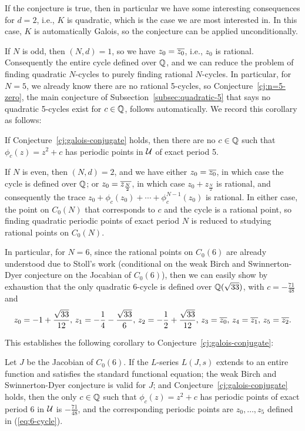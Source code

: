 If the conjecture is true, then in particular we have some interesting
consequences for $d = 2$, i.e., $K$ is quadratic, which is the case we
are most interested in. In this case, $K$ is automatically Galois, so
the conjecture can be applied unconditionally.

If $N$ is odd, then $(N, d) = 1$, so we have $z_0 = \overline{z_0}$, i.e.,
$z_0$ is rational. Consequently the entire cycle defined over $\mathbb{Q}$,
and we can reduce the problem of finding quadratic $N$-cycles to
purely finding rational $N$-cycles. In particular, for $N = 5$, we
already know there are no rational 5-cycles, so
Conjecture~\ref{cj:n=5-zero}, the main conjecture of
Subsection~\ref{subsec:quadratic-5} that says no quadratic 5-cycles
exist for $c \in \mathbb{Q}$, follows automatically. We record this corollary
as follows:

\begin{corollary}
  If Conjecture~\ref{cj:galois-conjugate} holds, then there are no $c
  \in \mathbb{Q}$ such that $\phi_c(z) = z^2 + c$ has periodic points in $\mathcal{U}$
  of exact period 5.
\end{corollary}

If $N$ is even, then $(N, d) = 2$, and we have either $z_0 =
\overline{z_0}$, in which case the cycle is defined over $\mathbb{Q}$; or $z_0 =
\overline{z_{\frac{N}{2}}}$, in which case $z_0 + z_{\frac{N}{2}}$ is
rational, and consequently the trace $z_0 + \phi_c(z_0) + \cdots +
\phi_c^{N-1}(z_0)$ is rational. In either case, the point on $C_0(N)$
that corresponds to $c$ and the cycle is a rational point, so finding
quadratic periodic points of exact period $N$ is reduced to studying
rational points on $C_0(N)$.

In particular, for $N = 6$, since the rational points on $C_0(6)$ are
already understood due to Stoll's work \cite{MR2465796} (conditional
on the weak Birch and Swinnerton-Dyer conjecture on the Jocabian of
$C_0(6)$), then we can easily show by exhaustion that the only
quadratic 6-cycle is defined over $\mathbb{Q}(\sqrt{33})$, with $c =
-\frac{71}{48}$ and
\begin{equation}
  \label{eq:6-cycle}
  z_0 = -1 + \frac{\sqrt{33}}{12},\,
  z_1 = -\frac{1}{4} - \frac{\sqrt{33}}{6},\,
  z_2 = -\frac{1}{2} + \frac{\sqrt{33}}{12},\,
  z_3 = \overline{z_0},\,
  z_4 = \overline{z_1},\,
  z_5 = \overline{z_2}.
\end{equation}

This establishes the following corollary to
Conjecture~\ref{cj:galois-conjugate}:

\begin{corollary}
  \label{cor:6-cycle}
  Let $J$ be the Jacobian of $C_0(6)$. If the $L$-series $L(J, s)$
  extends to an entire function and satisfies the standard functional
  equation; the weak Birch and Swinnerton-Dyer conjecture is valid for
  $J$; and Conjecture~\ref{cj:galois-conjugate} holds, then the only
  $c \in \mathbb{Q}$ such that $\phi_c(z) = z^2 + c$ has periodic points of
  exact period 6 in $\mathcal{U}$ is $-\frac{71}{48}$, and the corresponding
  periodic points are $z_0, \dots, z_5$ defined in (\ref{eq:6-cycle}).
\end{corollary}

